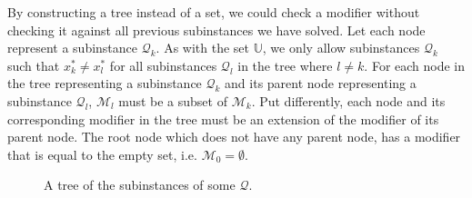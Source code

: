 By constructing a tree instead of a set, we could check a modifier without
checking it against all previous subinstances we have solved. Let each node
represent a subinstance $\mathcal{Q}_k$. As with the set $\mathbb{U}$, we only
allow subinstances $\mathcal{Q}_k$ such that $x_k^* \neq x_l^*$ for all
subinstances $\mathcal{Q}_l$ in the tree where $l \neq k$. For each node in the
tree representing a subinstance $\mathcal{Q}_k$ and its parent node
representing a subinstance $\mathcal{Q}_l$, $\mathcal{M}_l$ must be a subset of
$\mathcal{M}_k$. Put differently, each node and its corresponding modifier in
the tree must be an extension of the modifier of its parent node. The root node
which does not have any parent node, has a modifier that is equal to the empty
set, i.e. $\mathcal{M}_0 = \emptyset$.


\begin{figure}[h!]
\begin{center}

\end{center}
\caption{A tree of the subinstances of some $\mathcal{Q}$.}
\label{fig:mapgraph}
\end{figure}
